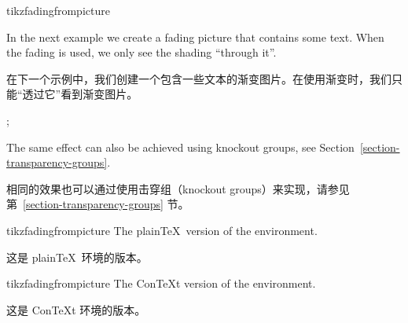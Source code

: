 \begin{environment}{{tikzfadingfrompicture}}
{\begin{codeexample}[preamble={\usetikzlibrary{fadings,patterns}}]
\end{codeexample}
    In the next example we create a fading picture that contains some text.
    When the fading is used, we only see the shading ``through it''.
    
    在下一个示例中，我们创建一个包含一些文本的渐变图片。在使用渐变时，我们只能“透过它”看到渐变图片。


\begin{codeexample}[preamble={\usetikzlibrary{fadings,patterns}}]
\begin{tikzfadingfrompicture}[name=tikz]
  ;
\end{tikzfadingfrompicture}

\end{codeexample}
}%

    The same effect can also be achieved using knockout groups, see
    Section~\ref{section-transparency-groups}.

    相同的效果也可以通过使用击穿组（knockout groups）来实现，请参见第~\ref{section-transparency-groups} 节。

\end{environment}

\begin{plainenvironment}{{tikzfadingfrompicture}}
    The plain\TeX\ version of the environment.

    这是 plain\TeX\ 环境的版本。

\end{plainenvironment}

\begin{contextenvironment}{{tikzfadingfrompicture}}
    The Con\TeX t version of the environment.

    这是 Con\TeX t 环境的版本。

\end{contextenvironment}

